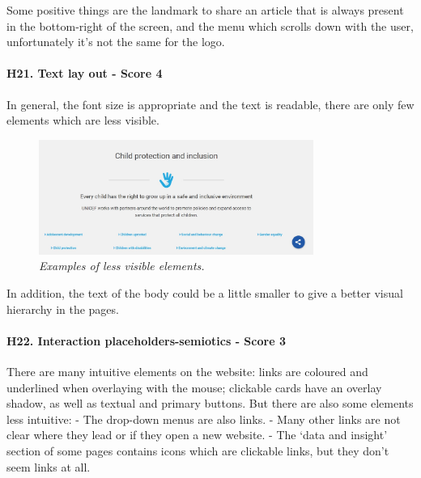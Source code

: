 \newline Some positive things are the landmark to share an article that is always present in the bottom-right of the screen, and the menu which scrolls down with the user, unfortunately it’s not the same for the logo.
\newline
\newline \paragraph{H21. Text lay out - Score 4}  \label{subsec:H21}	In general, the font size is appropriate and the text is readable, there are only few elements which are less visible.
\begin{figure}[!h]
	\begin{center}
		\includegraphics[width=0.8\textwidth]{FinalScores24.jpg}
		\captionsetup{font=small}
		\caption{\textit{Examples of less visible elements.}}
	\end{center}
\end{figure}
\newline In addition, the text of the body could be a little smaller to give a better visual hierarchy in the pages.
\newline
\newline \paragraph{H22. Interaction placeholders-semiotics - Score 3}  \label{subsec:H22}	There are many intuitive elements on the website: links are coloured and underlined when overlaying with the mouse; clickable cards have an overlay shadow, as well as textual and primary buttons.
\newline But there are also some elements less intuitive:
\newline -	The drop-down menus are also links.
\newline -	Many other links are not clear where they lead or if they open a new website.
\newline -	The ‘data and insight’ section of some pages contains icons which are clickable links, but they don’t seem links at all.
